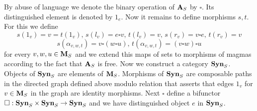 By abuse of language we denote the binary operation of $\mathbf{A}_S$ by $\square$. Its distinguished element is denoted by $1_e$. Now it remains to define morphisms $s,t$. For this we define
$$s(1_v) = v = t(1_v),\,s(l_v) = e\square v,\,t(l_v) = v,\,s(r_v) = v\square e,\,t(r_v) = v$$
$$s(\alpha_{v,w,t})=v\square(w\square u),\,t(\alpha_{v,w,t})=(v\square w)\square u$$
for every $v,w,u\in \mathbf{M}_S$ and we extend this maps of sets to morphisms of magmas according to the fact that $\mathbf{A}_S$ is free. Now we construct a category $\mathbf{Syn}_S$. Objects of $\mathbf{Syn}_S$ are elements of $\mathbf{M}_S$. Morphisms of $\mathbf{Syn}_S$ are composable paths in the directed graph defined above modulo relation that asserts that edges $1_v$ for $v\in \mathbf{M}_S$ in the graph are identity morphisms. Next $\square$ define a bifunctor $\square:\mathbf{Syn}_S\times \mathbf{Syn}_S \rightarrow \mathbf{Syn}_S$ and we have distinguished object $e$ in $\mathbf{Syn}_S$.

